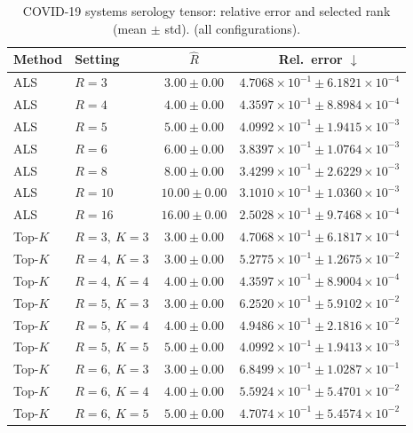 \begin{table}[t]
\centering
\caption{COVID-19 systems serology tensor: relative error and selected rank (mean \(\pm\) std). (all configurations).}
\label{tab:results_I438x6x11_R0_rho0.0_noise0.0}
\begin{tabular}{@{}llcc@{}}
\toprule
Method & Setting & \(\hat R\) & Rel.\ error \(\downarrow\) \\ \midrule
ALS & \(R=3\) & \(3.00 \pm 0.00\) & \(4.7068{\times}10^{-1} \pm 6.1821{\times}10^{-4}\) \\
ALS & \(R=4\) & \(4.00 \pm 0.00\) & \(4.3597{\times}10^{-1} \pm 8.8984{\times}10^{-4}\) \\
ALS & \(R=5\) & \(5.00 \pm 0.00\) & \(4.0992{\times}10^{-1} \pm 1.9415{\times}10^{-3}\) \\
ALS & \(R=6\) & \(6.00 \pm 0.00\) & \(3.8397{\times}10^{-1} \pm 1.0764{\times}10^{-3}\) \\
ALS & \(R=8\) & \(8.00 \pm 0.00\) & \(3.4299{\times}10^{-1} \pm 2.6229{\times}10^{-3}\) \\
ALS & \(R=10\) & \(10.00 \pm 0.00\) & \(3.1010{\times}10^{-1} \pm 1.0360{\times}10^{-3}\) \\
ALS & \(R=16\) & \(16.00 \pm 0.00\) & \(2.5028{\times}10^{-1} \pm 9.7468{\times}10^{-4}\) \\
Top-\(K\) & \(R=3,\ K=3\) & \(3.00 \pm 0.00\) & \(4.7068{\times}10^{-1} \pm 6.1817{\times}10^{-4}\) \\
Top-\(K\) & \(R=4,\ K=3\) & \(3.00 \pm 0.00\) & \(5.2775{\times}10^{-1} \pm 1.2675{\times}10^{-2}\) \\
Top-\(K\) & \(R=4,\ K=4\) & \(4.00 \pm 0.00\) & \(4.3597{\times}10^{-1} \pm 8.9004{\times}10^{-4}\) \\
Top-\(K\) & \(R=5,\ K=3\) & \(3.00 \pm 0.00\) & \(6.2520{\times}10^{-1} \pm 5.9102{\times}10^{-2}\) \\
Top-\(K\) & \(R=5,\ K=4\) & \(4.00 \pm 0.00\) & \(4.9486{\times}10^{-1} \pm 2.1816{\times}10^{-2}\) \\
Top-\(K\) & \(R=5,\ K=5\) & \(5.00 \pm 0.00\) & \(4.0992{\times}10^{-1} \pm 1.9413{\times}10^{-3}\) \\
Top-\(K\) & \(R=6,\ K=3\) & \(3.00 \pm 0.00\) & \(6.8499{\times}10^{-1} \pm 1.0287{\times}10^{-1}\) \\
Top-\(K\) & \(R=6,\ K=4\) & \(4.00 \pm 0.00\) & \(5.5924{\times}10^{-1} \pm 5.4701{\times}10^{-2}\) \\
Top-\(K\) & \(R=6,\ K=5\) & \(5.00 \pm 0.00\) & \(4.7074{\times}10^{-1} \pm 5.4574{\times}10^{-2}\) \\

\end{tabular}
\end{table}

